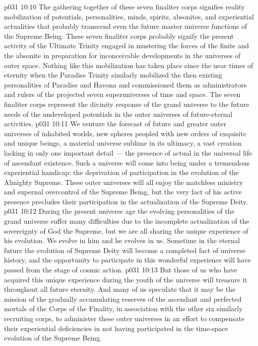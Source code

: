 \vs p031 10:10 The gathering together of these seven finaliter corps signifies reality mobilization of potentials, personalities, minds, spirits, absonites, and experiential actualities that probably transcend even the future master universe functions of the Supreme Being. These seven finaliter corps probably signify the present activity of the Ultimate Trinity engaged in mustering the forces of the finite and the absonite in preparation for inconceivable developments in the universes of outer space. Nothing like this mobilization has taken place since the near times of eternity when the Paradise Trinity similarly mobilized the then existing personalities of Paradise and Havona and commissioned them as administrators and rulers of the projected seven superuniverses of time and space. The seven finaliter corps represent the divinity response of the grand universe to the future needs of the undeveloped potentials in the outer universes of future\hyp{}eternal activities.
\vs p031 10:11 We venture the forecast of future and greater outer universes of inhabited worlds, new spheres peopled with new orders of exquisite and unique beings, a material universe sublime in its ultimacy, a vast creation lacking in only one important detail --- the presence of actual  in the universal life of ascendant existence. Such a universe will come into being under a tremendous experiential handicap: the deprivation of participation in the evolution of the Almighty Supreme. These outer universes will all enjoy the matchless ministry and supernal overcontrol of the Supreme Being, but the very fact of his active presence precludes their participation in the actualization of the Supreme Deity.
\vs p031 10:12 During the present universe age the evolving personalities of the grand universe suffer many difficulties due to the incomplete actualization of the sovereignty of God the Supreme, but we are all sharing the unique experience of his evolution. We evolve in him and he evolves in us. Sometime in the eternal future the evolution of Supreme Deity will become a completed fact of universe history, and the opportunity to participate in this wonderful experience will have passed from the stage of cosmic action.
\vs p031 10:13 But those of us who have acquired this unique experience during the youth of the universe will treasure it throughout all future eternity. And many of us speculate that it may be the mission of the gradually accumulating reserves of the ascendant and perfected mortals of the Corps of the Finality, in association with the other six similarly recruiting corps, to administer these outer universes in an effort to compensate their experiential deficiencies in not having participated in the time\hyp{}space evolution of the Supreme Being.
